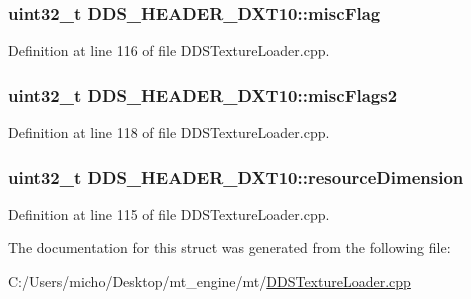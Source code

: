 \subsubsection[{\texorpdfstring{misc\+Flag}{miscFlag}}]{\setlength{\rightskip}{0pt plus 5cm}uint32\+\_\+t D\+D\+S\+\_\+\+H\+E\+A\+D\+E\+R\+\_\+\+D\+X\+T10\+::misc\+Flag}\hypertarget{struct_d_d_s___h_e_a_d_e_r___d_x_t10_ab1ed2a42216afc03971b56f7833c8c05_ab1ed2a42216afc03971b56f7833c8c05}{}\label{struct_d_d_s___h_e_a_d_e_r___d_x_t10_ab1ed2a42216afc03971b56f7833c8c05_ab1ed2a42216afc03971b56f7833c8c05}


Definition at line 116 of file D\+D\+S\+Texture\+Loader.\+cpp.

\subsubsection[{\texorpdfstring{misc\+Flags2}{miscFlags2}}]{\setlength{\rightskip}{0pt plus 5cm}uint32\+\_\+t D\+D\+S\+\_\+\+H\+E\+A\+D\+E\+R\+\_\+\+D\+X\+T10\+::misc\+Flags2}\hypertarget{struct_d_d_s___h_e_a_d_e_r___d_x_t10_acfdbfd584a5c6de801da3c8d2f0e1a40_acfdbfd584a5c6de801da3c8d2f0e1a40}{}\label{struct_d_d_s___h_e_a_d_e_r___d_x_t10_acfdbfd584a5c6de801da3c8d2f0e1a40_acfdbfd584a5c6de801da3c8d2f0e1a40}


Definition at line 118 of file D\+D\+S\+Texture\+Loader.\+cpp.

\subsubsection[{\texorpdfstring{resource\+Dimension}{resourceDimension}}]{\setlength{\rightskip}{0pt plus 5cm}uint32\+\_\+t D\+D\+S\+\_\+\+H\+E\+A\+D\+E\+R\+\_\+\+D\+X\+T10\+::resource\+Dimension}\hypertarget{struct_d_d_s___h_e_a_d_e_r___d_x_t10_a9e52c1afbd5b8205619d1b89a367b438_a9e52c1afbd5b8205619d1b89a367b438}{}\label{struct_d_d_s___h_e_a_d_e_r___d_x_t10_a9e52c1afbd5b8205619d1b89a367b438_a9e52c1afbd5b8205619d1b89a367b438}


Definition at line 115 of file D\+D\+S\+Texture\+Loader.\+cpp.



The documentation for this struct was generated from the following file\+:\begin{DoxyCompactItemize}
\item 
C\+:/\+Users/micho/\+Desktop/mt\+\_\+engine/mt/\hyperlink{_d_d_s_texture_loader_8cpp}{D\+D\+S\+Texture\+Loader.\+cpp}\end{DoxyCompactItemize}
